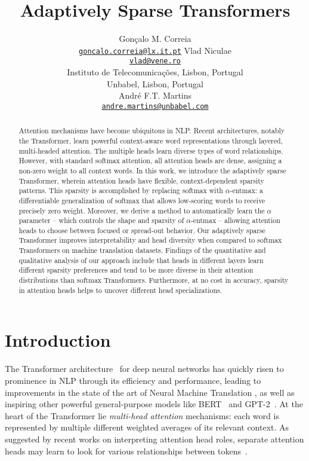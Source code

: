\documentclass[11pt,a4paper]{article}
\title{Adaptively Sparse Transformers}
\author{
Gon\c{c}alo M. Correia\textsuperscript{\markIT{}} \\
\href{mailto:goncalo.correia@lx.it.pt}{\tt goncalo.correia@lx.it.pt}
\And
Vlad Niculae\textsuperscript{\markIT{}} \\
\href{mailto:vlad@vene.ro}{\tt vlad@vene.ro} \\[1ex]
\textsuperscript{\markIT{}}Instituto de Telecomunica\c{c}\~oes, Lisbon,
Portugal\\
\textsuperscript{\markUnbabel}Unbabel, Lisbon, Portugal\\
\And
Andr\'e F.T. Martins\textsuperscript{\markIT{} \markUnbabel{}} \\
\href{mailto:andre.martins@unbabel.com}{\tt andre.martins@unbabel.com}\\
}
\date{}
\newcommand*\entmaxtext{entmax\xspace}
\begin{document}
\maketitle 

\begin{abstract}
Attention mechanisms have become ubiquitous in NLP. Recent
architectures, notably the Transformer, learn powerful context-aware
word representations through layered, multi-headed attention. The
multiple heads learn diverse types of word relationships. However,
with standard softmax attention, all attention heads are dense,
assigning a non-zero weight to all context words.
In this work, we introduce the adaptively sparse Transformer, wherein
attention heads have flexible, context-dependent sparsity patterns.
This sparsity is accomplished by replacing softmax with
$\alpha$-\entmaxtext{}: a differentiable generalization of softmax
that allows low-scoring words to receive precisely zero weight.
Moreover, we derive a method to automatically learn the $\alpha$
parameter -- which controls the shape and sparsity of
$\alpha$-\entmaxtext{} -- allowing attention heads to choose between
focused or spread-out behavior.
Our adaptively sparse Transformer improves interpretability and head
diversity when compared to softmax Transformers on machine
translation datasets. Findings of the quantitative and qualitative
analysis of our approach include that heads in different layers learn
different sparsity preferences and tend to be more diverse in their
attention distributions than softmax Transformers. Furthermore, at no
cost in accuracy, sparsity in attention heads helps to uncover
different head specializations.
\end{abstract}

\section{Introduction}

The Transformer architecture~\citep{vaswani2017attention} for deep
neural networks has quickly risen to prominence in NLP through its
efficiency and performance, leading to improvements in the state of
the art of Neural Machine Translation
\citep[NMT;][]{marian,ott2018scaling}, as well as inspiring other
powerful general-purpose models like BERT~\citep{devlin2018bert} and
\mbox{GPT-2}~\citep{radford2019language}. At the heart of the
Transformer lie \emph{multi-head attention} mechanisms: each word is
represented by multiple different weighted averages of its relevant
context. As suggested by recent works on interpreting attention head
roles, separate attention heads may learn to look for various
relationships between tokens~\citep{tang2018why,raganato2018analysis,
marecek-rosa-2018-extracting,bert-rediscovers,specialized}.
\end{document}
